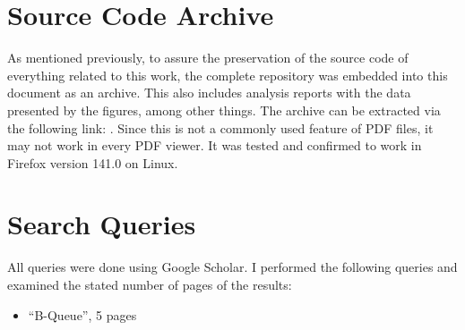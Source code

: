 \chapter{Source Code Archive}
\label{app:source-code-archive}
As mentioned previously, to assure the preservation of the source code of everything related to this work,
the complete repository was embedded into this document as an archive.
This also includes analysis reports with the data presented by the figures, among other things.
The archive can be extracted via the following link: .
Since this is not a commonly used feature of PDF files, it may not work in every PDF viewer.
It was tested and confirmed to work in Firefox version 141.0 on Linux.

\chapter{Search Queries}
\label{app:repro-search-queries}
All queries were done using Google Scholar.
I performed the following queries and examined the stated number of pages of the results:
\begin{itemize}
    \item ``B-Queue'', 5 pages
\end{itemize}




{
    \listoffigures

    \let\clearpage\relax
    \let\cleardoublepage\relax

    \listoflistings
}
